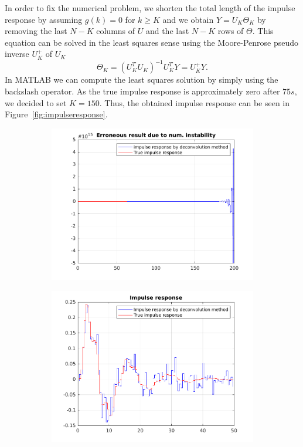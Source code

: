 \documentclass{scrartcl}
\begin{document}
In order to fix the numerical problem, we shorten the total length of the impulse response by assuming $g(k) = 0$ for $k \geq K$ and we obtain $Y = U_{K} \Theta_{K}$ by removing the last $N-K$ columns of $U$ and the last $N-K$ rows of $\Theta$. 
This equation can be solved in the least squares sense using the Moore-Penrose pseudo inverse $U_{K}^+$ of $U_{K}$
\begin{equation}
	\Theta_{K} = (U^{T}_{K} U_{K})^{-1} U^{T}_{K} Y = U_{K}^{+} Y.
\end{equation}
In MATLAB we can compute the least squares solution by simply using the backslash operator.
As the true impulse response is approximately zero after $75 s$, we decided to set $K = 150$. Thus, the obtained impulse response can be seen in Figure~\ref{fig:impulseresponse}. 
\begin{figure}[h]
	\centering
	\begin{subfigure}{.49\textwidth}
		\includegraphics[width=\textwidth]{figures/original_impulse_response.pdf}
		\label{fig:originalimpulse}
	\end{subfigure}
	\begin{subfigure}{.49\textwidth}
		\includegraphics[width=\textwidth]{figures/impulse_response.pdf}

\end{subfigure}
\end{figure}
\end{document}
